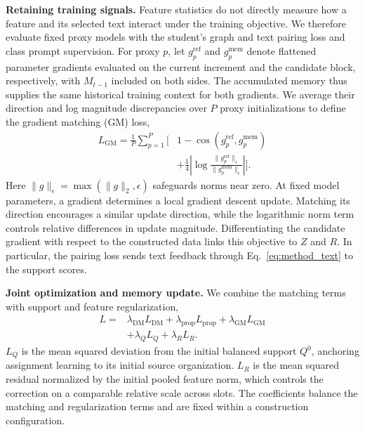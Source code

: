 \textbf{Retaining training signals.}
Feature statistics do not directly measure how a feature and its selected
text interact under the training objective. We therefore evaluate fixed
proxy models with the student's graph and text pairing loss and class
prompt supervision. For proxy $p$, let $g_p^{\mathrm{ref}}$ and
$g_p^{\mathrm{mem}}$ denote flattened parameter gradients evaluated on
the current increment and the candidate block, respectively, with
$M_{t-1}$ included on both sides. The accumulated memory thus supplies
the same historical training context for both gradients. We average
their direction and log magnitude discrepancies over $P$ proxy
initializations to define the gradient matching (GM) loss,
\begin{equation}
\begin{aligned}
 L_{\mathrm{GM}}=\frac{1}{P}\sum_{p=1}^{P}\bigg[&
 1-\cos(g_p^{\mathrm{ref}},g_p^{\mathrm{mem}})\\
 &+\frac{1}{4}\left|
 \log\frac{\|g_p^{\mathrm{ref}}\|_{\epsilon}}
               {\|g_p^{\mathrm{mem}}\|_{\epsilon}}
 \right|\bigg].
\end{aligned}
\label{eq:method_gm}
\end{equation}
Here $\|g\|_{\epsilon}=\max(\|g\|_2,\epsilon)$ safeguards norms near zero.
At fixed model parameters, a gradient determines a local
gradient descent update. Matching its
direction encourages a similar update direction, while the logarithmic norm
term controls relative differences in update magnitude. Differentiating
the candidate gradient with respect to the constructed data links this
objective to $Z$ and $R$. In particular, the pairing loss sends text
feedback through Eq.~\eqref{eq:method_text} to the support scores.

\textbf{Joint optimization and memory update.}
We combine the matching terms with support and feature regularization,
\begin{equation}
\begin{aligned}
 L={}&\lambda_{\mathrm{DM}}L_{\mathrm{DM}}
 +\lambda_{\mathrm{prop}}L_{\mathrm{prop}}
 +\lambda_{\mathrm{GM}}L_{\mathrm{GM}}\\
 &+\lambda_Q L_Q+\lambda_R L_R .
\end{aligned}
\label{eq:method_total}
\end{equation}
$L_Q$ is the mean squared deviation from the initial balanced support
$Q^0$, anchoring assignment learning to its initial source organization.
$L_R$ is the mean squared residual normalized by the initial pooled
feature norm, which controls the correction on a comparable relative
scale across slots. The coefficients balance the matching and
regularization terms and are fixed within a construction configuration.

